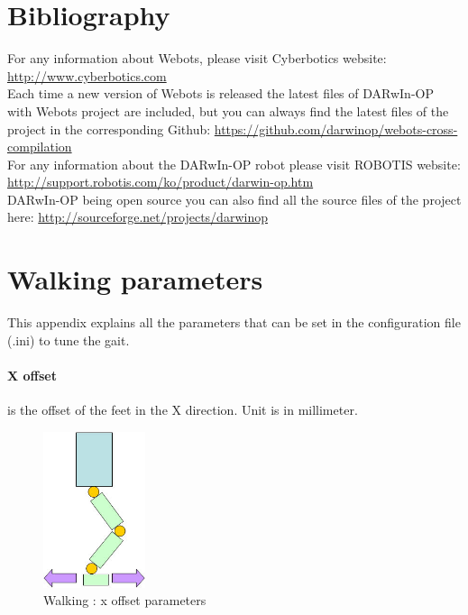 \documentclass[a4paper, 12pt]{article}  		%
\begin{document}
\newpage
\section{Bibliography}

For any information about Webots, please visit Cyberbotics website: \url{http://www.cyberbotics.com}\\

Each time a new version of Webots is released the latest files of DARwIn-OP with Webots project are included, but you can always find the latest files of the project in the corresponding Github: \url{https://github.com/darwinop/webots-cross-compilation}\\

For any information about the DARwIn-OP robot please visit ROBOTIS website: \url{http://support.robotis.com/ko/product/darwin-op.htm}\\

DARwIn-OP being open source you can also find all the source files of the project here: \url{http://sourceforge.net/projects/darwinop}\\


\appendix
\newpage
{} %


\section{Walking parameters} \label{sec:walkParameter}

This appendix explains all the parameters that can be set in the configuration file (.ini) to tune the gait.\\ 

\paragraph*{X offset}
is the offset of the feet in the X direction. Unit is in millimeter.
\begin{figure}[H]
\begin{center}
\includegraphics[width=3cm]{x_offset.jpg}
\caption{Walking : x offset parameters}
\label{x_offset}
\end{center}
\end{figure}
\end{document}
